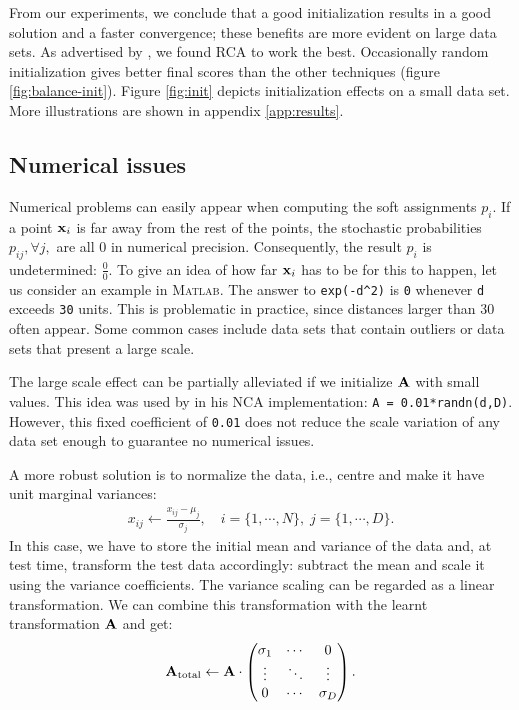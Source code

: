         From our experiments, we conclude that a good
        initialization results in a good solution and a faster convergence; these benefits are more evident on
        large data sets. As advertised by \citet{butman2008}, we found RCA to work the best. Occasionally random initialization gives better final scores than the other techniques (figure \ref{fig:balance-init}). Figure \ref{fig:init} depicts initialization effects on a small data set. More illustrations are shown in appendix \ref{app:results}. 

\subsection{Numerical issues}
\label{subsec:numerical-issues}

	Numerical problems can easily appear when computing the soft assignments $p_i$. If a point
        $\mathbf{x}_i$ is far away from the rest of the points, the stochastic probabilities $p_{ij}, \forall j,$ are all 0 in numerical precision. Consequently, the result $p_i$ is undetermined: $\frac{0}{0}$. 
	To give an idea of how far $\mathbf{x}_i$ has to be for this to happen, let us consider an example in \textsc{Matlab}. The answer to 
        \texttt{exp(-d\^{}2)} is \texttt{0} whenever \texttt{d} exceeds \texttt{30} units.
	This is problematic in practice, since distances larger than 30 often appear. Some common cases include data sets that contain outliers or data sets that present a large scale. 

	The large scale effect can be partially alleviated if we initialize $\mathbf{A}$ with small values. This idea was used by \citet{maaten-online} in his NCA implementation: \texttt{A = 0.01*randn(d,D)}. However, this fixed coefficient of \texttt{0.01} does not reduce the scale variation of any data set enough to guarantee no numerical issues.


	A more robust solution is to normalize the
        data, i.e., centre and make it have unit marginal variances:
        \begin{align}
            x_{ij} \leftarrow \frac{x_{ij} - \mu_j}{\sigma_j}, \quad i =
	    \{1,\cdots,N\},\; j = \{1,\cdots,D\}.
        \end{align}
        In this case, we have to store the initial mean and variance of the data and, at test time, transform the test data accordingly: subtract the mean and scale it using the variance coefficients. The variance scaling can be regarded as a linear transformation. We can combine this transformation with the learnt transformation $\mathbf{A}$ and get:
        \begin{align}
            \mathbf{A}_{\text{total}} \leftarrow \mathbf{A}  \cdot \begin{pmatrix}
                  \sigma_1 &  \cdots & 0 \\
                  \vdots  &   \ddots & \vdots  \\
                  0 & \cdots & \sigma_D
                 \end{pmatrix}.
        \end{align}

